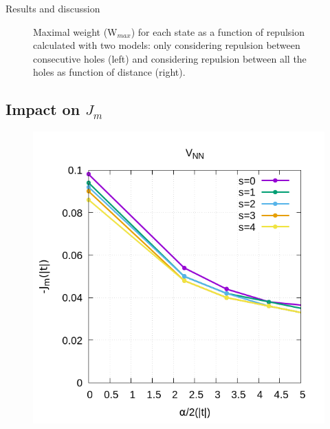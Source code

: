 \documentclass[12pt,twoside]{report}
\begin{document}
\begin{chapter}{Results and discussion}
\begin{figure}[h!]
\begin{minipage}{0.4\textwidth}
		\end{minipage}
		\caption{\label{fig_v1n} Maximal weight (W$_{max}$) for each state as a function of repulsion calculated with two models: only considering repulsion between consecutive holes (left) and considering repulsion between all the holes as function of distance (right). }
	\end{figure}
	
	\subsection{Impact on $J_m$}
	\begin{figure}[h!]
		\centering
		\hspace{-2cm}
		\begin{minipage}{0.4\textwidth}
			\includegraphics[scale=0.35]{J_vs_xrepv1.png}
		\end{minipage}
		\hspace{2cm}
		\begin{minipage}{0.4\textwidth}

\end{minipage}
\end{figure}
\end{chapter}
\end{document}
